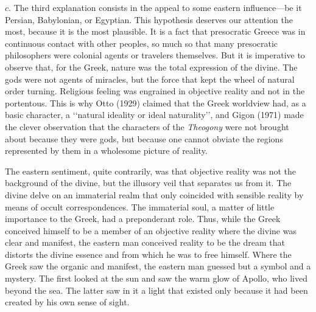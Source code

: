 \documentclass[a4paper]{article}
\begin{document}
$ c. $ The third explanation consists in the appeal to some eastern
influence---be it Persian, Babylonian, or Egyptian. This hypothesis deserves our
attention the most, because it is the most plausible. It is a fact that
presocratic Greece was in continuous contact with other peoples, so much so that
many presocratic philosophers were colonial agents or travelers themselves.
But it is imperative to observe that, for the Greek, nature was the total
expression of the divine. The gods were not agents of miracles, but the force
that kept the wheel of natural order turning. Religious feeling was engrained in
objective reality and not in the portentous. This is why Otto (1929) claimed
that the Greek worldview had, as a basic character, a \lq\lq natural ideality or
ideal naturality\rq\rq{}, and Gigon (1971) made the clever observation that the
characters of the \textit{Theogony} were not brought about because they were
gods, but because one cannot obviate the regions represented by them in a
wholesome picture of reality.

The eastern sentiment, quite contrarily, was that objective reality was not the
background of the divine, but the illusory veil that separates us from it. The
divine delve on an immaterial realm that only coincided with sensible reality by
means of occult correspondences. The immaterial soul, a matter of little
importance to the Greek, had a preponderant role. Thus, while the Greek
conceived himself to be a member of an objective reality where the divine was
clear and manifest, the eastern man conceived reality to be the dream that
distorts the divine essence and from which he was to free himself. Where the
Greek saw the organic and manifest, the eastern man guessed but a symbol and a
mystery. The first looked at the sun and saw the warm glow of Apollo, who lived
beyond the sea. The latter saw in it a light that existed only because it had been
created by his own sense of sight.
\end{document}

